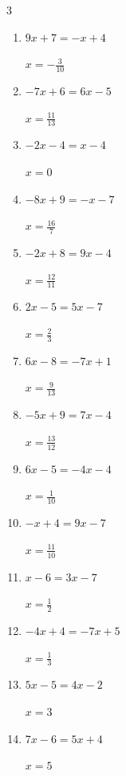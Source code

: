 \begin{multicols}{3}
\begin{enumerate}
        $\displaystyle x=-\frac{11}{4}$

\columnbreak %

  \item $9x+7=-x+4$

        $\displaystyle x=-\frac{3}{10}$

  \item $-7x+6=6x-5$

        $\displaystyle x=\frac{11}{13}$

  \item $-2x-4=x-4$

        $\displaystyle x=0$

  \item $-8x+9=-x-7$

        $\displaystyle x=\frac{16}{7}$

  \item $-2x+8=9x-4$

        $\displaystyle x=\frac{12}{11}$

  \item $2x-5=5x-7$

        $\displaystyle x=\frac{2}{3}$

  \item $6x-8=-7x+1$

        $\displaystyle x=\frac{9}{13}$

  \item $-5x+9=7x-4$

        $\displaystyle x=\frac{13}{12}$

  \item $6x-5=-4x-4$

        $\displaystyle x=\frac{1}{10}$

  \item $-x+4=9x-7$

        $\displaystyle x=\frac{11}{10}$

  \item $x-6=3x-7$

        $\displaystyle x=\frac{1}{2}$

  \item $-4x+4=-7x+5$

        $\displaystyle x=\frac{1}{3}$

  \item $5x-5=4x-2$

        $\displaystyle x=3$

  \item $7x-6=5x+4$

        $\displaystyle x=5$


\end{enumerate}
\end{multicols}
